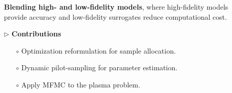 \documentclass{beamer}
\begin{document}
\begin{frame}[t]
\begin{itemize}[leftmargin=5pt]
{\begin{itemize}[leftmargin=15pt]
                \textcolor{mybrown1}{{\bf Blending high- and low-fidelity models}, where high-fidelity models provide accuracy and low-fidelity surrogates reduce computational cost.}

                
                

                

                
        
            \end{itemize}
            }
            \vspace{2mm}
            \item[$\triangleright$] \textcolor{myblue3}{\bf Contributions}
            \vspace{1mm}
                {\fontsize{10}{10}\selectfont
                \begin{itemize}[leftmargin=15pt] 
                \item[$\circ$] Optimization reformulation for sample allocation.
                \item[$\circ$] Dynamic pilot-sampling for parameter estimation. 
                \item[$\circ$] Apply MFMC to the plasma problem. 
                \end{itemize}
                }
    \end{itemize}
\end{frame}
\end{document}
